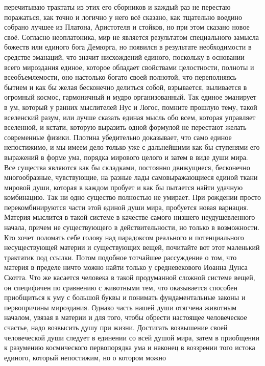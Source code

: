 перечитываю трактаты из этих его сборников и каждый раз не перестаю поражаться,
как точно и логично у него всё сказано, как тщательно воедино собрано лучшее из
Платона, Аристотеля и стойков, но при этом сказано новое своё. Согласно
неоплатоника, мир не является результатом специального замысла божеств или
единого бога Демюрга, но появился в результате необходимости в средстве
эманаций, что значит нисхождений единого, поскольку в основании всего мироздания
единое, которое обладает свойствами целостности, полноты и всеобъемлемости, оно
настолько богато своей полнотой, что переполняясь бытием и как бы желая
бесконечно делиться собой, взрывается, выливается в огромный космос, гармоничный
и мудро организованный. Так единое эманирует в ум, который у ранних мыслителей
Нус и Логос, помните прошлую тему, такой вселенский разум, или лучше сказать
единая мысль обо всем, которая управляет вселенной, и кстати, которую выразить
одной формулой не перестают желать современные физики. Плотина убедительно
доказывает, что само единое непостижимо, и мы имеем дело только уже с
дальнейшими как бы ступенями его выражений в форме ума, порядка мирового целого
и затем в виде души мира. Все существа являются как бы складками, постоянно
движущиеся, бесконечно многообразные, чувствующие, на разные лады
самовыражающиеся единой ткани мировой души, которая в каждом пробует и как бы
пытается найти удачную комбинацию. Так ни одно существо полностью не умирает.
При рождении просто перекомбинируются части этой единой души мира, пробуется
новая вариация. Материя мыслится в такой системе в качестве самого низшего
неудушевленного начала, причем не существующего в действительности, но только в
возможности. Кто хочет поломать себе голову над парадоксом реального и
потенциального несуществующей материи и существующих вещей, почитайте вот этот
маленький трактатик под ссылки. Потом подобное тотчайшее рассуждение о том, что
материя в пределе ничто можно найти только у средневекового Иоанна Дунса Скотта.
Что же касается человека в такой продуманной сложной системе вещей, он
специфичен по сравнению с животными тем, что оказывается способен приобщиться к
уму с большой буквы и понимать фундаментальные законы и первопричины мироздания.
Однако часть нашей души отягчена животным началом, увязая в материи и для того,
чтобы обрести настоящее человеческое счастье, надо возвысить душу при жизни.
Достигать возвышение своей человеческой души следует в единении со всей душой
мира, затем в приобщении к разумению космического первопорядка ума и наконец в
воззрении того истока единого, который непостижим, но о котором можно
